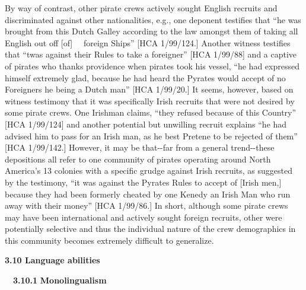 \begin{styleStandard}
By way of contrast, other pirate crews actively sought English recruits and discriminated against other nationalities, e.g., one deponent testifies that “he was brought from this Dutch Galley according to the law amongst them of taking all English out off [of] \ \ foreign Ships” [HCA 1/99/124.] Another witness testifies that “twas against their Rules to take a foreigner” [HCA 1/99/88] and a captive of pirates who thanks providence when pirates took his vessel, “he had expressed himself extremely glad, because he had heard the Pyrates would accept of no Foreigners he being a Dutch man” [HCA 1/99/20.] It seems, however, based on witness testimony that it was specifically Irish recruits that were not desired by some pirate crews. One Irishman claims, “they refused because of this Country” [HCA 1/99/124] and another potential but unwilling recruit explains “he had advised him to pass for an Irish man, as he best Pretene to be rejected of them” [HCA 1/99/142.] However, it may be that-{}-far from a general trend-{}-these depositions all refer to one community of pirates operating around North America’s 13 colonies with a specific grudge against Irish recruits, as suggested by the testimony, “it was against the Pyrates Rules to accept of [Irish men,] because they had been formerly cheated by one Kenedy an Irish Man who run away with their money” [HCA 1/99/86.] In short, although some pirate crews may have been international and actively sought foreign recruits, other were potentially selective and thus the individual nature of the crew demographics in this community becomes extremely difficult to generalize. \ 
\end{styleStandard}

\begin{styleStandard}
\textbf{3.10 Language abilities }
\end{styleStandard}

\begin{styleStandard}
\ \ \textbf{3.10.1} \textbf{Monolingualism}
\end{styleStandard}

